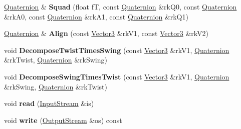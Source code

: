 \begin{DoxyCompactItemize}
\item 
\hyperlink{class_i_dream_sky_1_1_quaternion}{Quaternion} \& {\bfseries Squad} (float fT, const \hyperlink{class_i_dream_sky_1_1_quaternion}{Quaternion} \&rk\+Q0, const \hyperlink{class_i_dream_sky_1_1_quaternion}{Quaternion} \&rk\+A0, const \hyperlink{class_i_dream_sky_1_1_quaternion}{Quaternion} \&rk\+A1, const \hyperlink{class_i_dream_sky_1_1_quaternion}{Quaternion} \&rk\+Q1)\hypertarget{class_i_dream_sky_1_1_quaternion_a312369b567fdf89cbb0b285e5f2ef710}{}\label{class_i_dream_sky_1_1_quaternion_a312369b567fdf89cbb0b285e5f2ef710}

\item 
\hyperlink{class_i_dream_sky_1_1_quaternion}{Quaternion} \& {\bfseries Align} (const \hyperlink{class_i_dream_sky_1_1_vector3}{Vector3} \&rk\+V1, const \hyperlink{class_i_dream_sky_1_1_vector3}{Vector3} \&rk\+V2)\hypertarget{class_i_dream_sky_1_1_quaternion_a68451a14da45bedae3297da18d24f50b}{}\label{class_i_dream_sky_1_1_quaternion_a68451a14da45bedae3297da18d24f50b}

\item 
void {\bfseries Decompose\+Twist\+Times\+Swing} (const \hyperlink{class_i_dream_sky_1_1_vector3}{Vector3} \&rk\+V1, \hyperlink{class_i_dream_sky_1_1_quaternion}{Quaternion} \&rk\+Twist, \hyperlink{class_i_dream_sky_1_1_quaternion}{Quaternion} \&rk\+Swing)\hypertarget{class_i_dream_sky_1_1_quaternion_a2d4d5110c6a7aa48bd3bc5f29a3395ca}{}\label{class_i_dream_sky_1_1_quaternion_a2d4d5110c6a7aa48bd3bc5f29a3395ca}

\item 
void {\bfseries Decompose\+Swing\+Times\+Twist} (const \hyperlink{class_i_dream_sky_1_1_vector3}{Vector3} \&rk\+V1, \hyperlink{class_i_dream_sky_1_1_quaternion}{Quaternion} \&rk\+Swing, \hyperlink{class_i_dream_sky_1_1_quaternion}{Quaternion} \&rk\+Twist)\hypertarget{class_i_dream_sky_1_1_quaternion_ae20aebbc09cd6379352503e69c85b43e}{}\label{class_i_dream_sky_1_1_quaternion_ae20aebbc09cd6379352503e69c85b43e}

\item 
void {\bfseries read} (\hyperlink{class_i_dream_sky_1_1_input_stream}{Input\+Stream} \&is)\hypertarget{class_i_dream_sky_1_1_quaternion_afdd69d6f15b7a2115f2dfe57e009380c}{}\label{class_i_dream_sky_1_1_quaternion_afdd69d6f15b7a2115f2dfe57e009380c}

\item 
void {\bfseries write} (\hyperlink{class_i_dream_sky_1_1_output_stream}{Output\+Stream} \&os) const \hypertarget{class_i_dream_sky_1_1_quaternion_ac3516707277a0c53ca03ce906a523b18}{}\label{class_i_dream_sky_1_1_quaternion_ac3516707277a0c53ca03ce906a523b18}

\end{DoxyCompactItemize}
